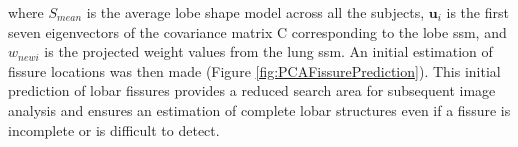 {\noindent where $S_{mean}$ is the average lobe shape model across all the subjects, $\mathbf{u}_i$ is the first seven eigenvectors of the covariance matrix C corresponding to the lobe \gls{ssm}, and $w_{newi}$ is the projected weight values from the lung \gls{ssm}. An initial estimation of fissure locations was then made (Figure \ref{fig:PCAFissurePrediction}). This initial prediction of lobar fissures provides a reduced search area for subsequent image analysis and ensures an estimation of complete lobar structures even if a fissure is incomplete or is difficult to detect.

\begin{figure}[htbp] 
\centering
\begin{subfigure}{.35\linewidth}%

\end{subfigure}
\end{figure}}
